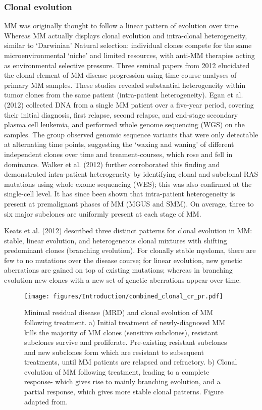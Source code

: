 \subsubsection{Clonal evolution}
MM was originally thought to follow a linear pattern of evolution over time.
Whereas MM actually displays clonal evolution and intra-clonal heterogeneity, similar to `Darwinian' Natural selection: individual clones compete for the same microenvironmental `niche' and limited resources, with anti-MM therapies acting as environmental selective pressure.
Three seminal papers from 2012 elucidated the clonal element of MM disease progression using time-course analyses of primary MM samples\cite{egan2012whole, keats2012clonal, walker2012intraclonal}.
These studies revealed substantial heterogeneity within tumor clones from the same patient (intra-patient heterogeneity).
Egan et al. (2012) collected DNA from a single MM patient over a five-year period, covering their initial diagnosis, first relapse, second relapse, and end-stage secondary plasma cell leukemia, and performed whole genome sequencing (WGS) on the samples\cite{egan2012whole}.
The group observed genomic sequence variants that were only detectable at alternating time points, suggesting the `waxing and waning' of different independent clones over time and treament-courses, which rose and fell in dominance\cite{egan2012whole}.
Walker et al. (2012) further corroborated this finding and demonstrated intra-patient heterogeneity by identifying clonal and subclonal RAS mutations using whole exome sequencing (WES); this was also confirmed at the single-cell level\cite{walker2012intraclonal}\@.
It has since been shown that intra-patient heterogeneity is present at premalignant phases of MM (MGUS and SMM)\@.
On average, three to six major subclones are uniformly present at each stage of MM\cite{furukawa2020molecular}.

Keats et al. (2012) described three distinct patterns for clonal evolution in MM: stable, linear evolution, and heterogeneous clonal mixtures with shifting predominant clones (branching evolution)\cite{keats2012clonal}.
For clonally stable myeloma, there are few to no mutations over the disease course;
for linear evolution, new genetic aberrations are gained on top of existing mutations;
whereas in branching evolution new clones with a new set of genetic aberrations appear over time.
%
\begin{figure}[htb]
\centering
\texttt{[image: figures/Introduction/combined\_clonal\_cr\_pr.pdf]}
\caption[Clonal evolution of MM with treatment]{Minimal residual disease (MRD) and clonal evolution of MM following treatment.
a) Initial treatment of newly-diagnosed MM kills the majority of MM clones (sensitive subclones), resistant subclones survive and proliferate.
Pre-existing resistant subclones and new subclones form which are resistant to subsequent treatments, until MM patients are relapsed and refractory.
b) Clonal evolution of MM following treatment, leading to a complete response- which gives rise to mainly branching evolution, and a partial response, which gives more stable clonal patterns.
Figure adapted from\cite{jones2019clonal}.
}
\label{fig:mrd_clones}
\end{figure}

